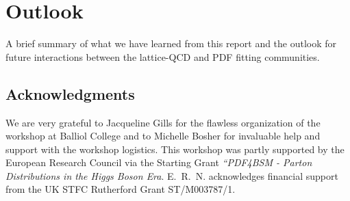 \section{Outlook}
\label{sec:outlook}

A brief summary of what we have learned from this report
and the outlook for future interactions between the lattice-QCD and PDF fitting communities.


\subsection*{Acknowledgments}

We are very grateful to Jacqueline Gills for the flawless organization
of the workshop at Balliol College and to Michelle Bosher for
invaluable help and support with the workshop logistics.
%
This workshop was partly supported by the European Research Council via
the Starting Grant {\it ``PDF4BSM - Parton Distributions in the
  Higgs Boson Era}.
%
E.~R.~N. acknowledges financial support from the
UK STFC Rutherford Grant ST/M003787/1.
